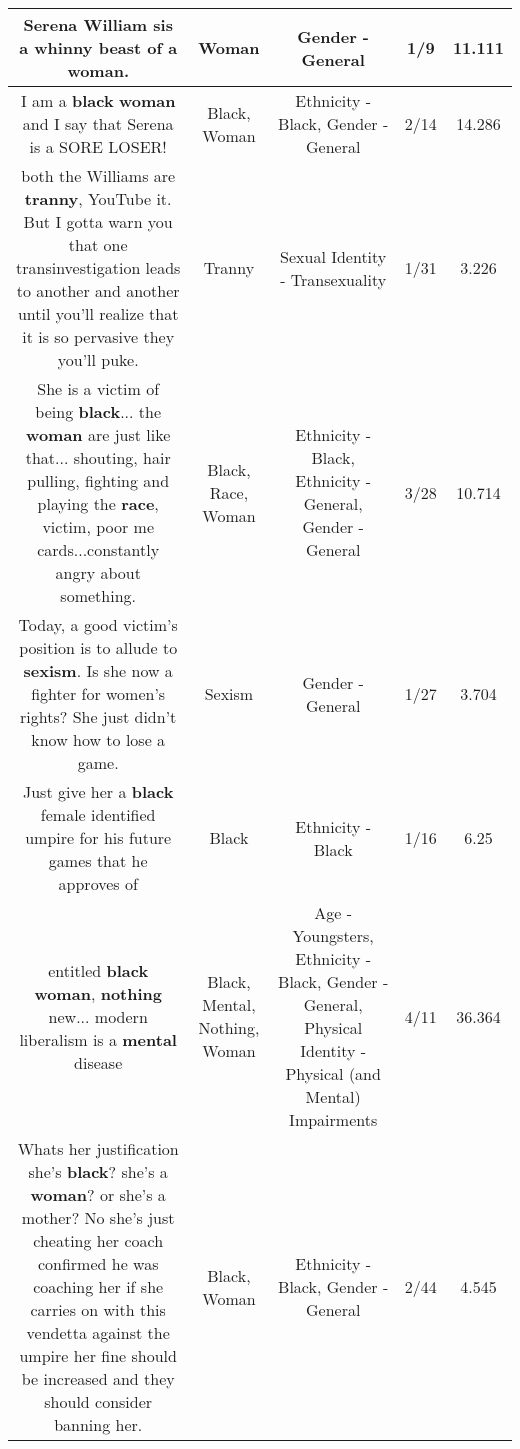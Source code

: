 \documentclass[11pt]{article}
\newlength\mylength
\begin{document}
\begin{center}
\begin{longtable}{|C{.65\mylength}|C{.30\mylength}|C{.12\mylength}|C{.12\mylength}|C{.12\mylength}|}
  \small Serena William sis a whinny beast of a \textbf{woman}.\normalsize   & Woman & Gender - General & 1/9 & 11.111 \\  \hline
  \small I am a \textbf{black} \textbf{woman} and I say that Serena is a SORE LOSER!\normalsize   & Black, Woman & Ethnicity - Black, Gender - General & 2/14 & 14.286 \\  \hline
  \small both the Williams are \textbf{tranny}, YouTube it. But I gotta warn you that one transinvestigation leads to another and another until you'll realize that it is so pervasive they you'll puke.\normalsize   & Tranny & Sexual Identity - Transexuality & 1/31 & 3.226 \\  \hline
  \small She is a victim of being \textbf{black}... the \textbf{woman} are just like that... shouting, hair pulling, fighting and playing the \textbf{race}, victim, poor me cards...constantly angry about something.\normalsize   & Black, Race, Woman & Ethnicity - Black, Ethnicity - General, Gender - General & 3/28 & 10.714 \\  \hline
  \small Today, a good victim's position is to allude to \textbf{sexism}. Is she now a fighter for women's rights? She just didn't know how to lose a game.\normalsize   & Sexism & Gender - General & 1/27 & 3.704 \\  \hline
  \small Just give her a \textbf{black} female identified umpire for his future games that he approves of\normalsize   & Black & Ethnicity - Black & 1/16 & 6.25 \\  \hline
  \small entitled \textbf{black} \textbf{woman}, \textbf{nothing} new... modern liberalism is a \textbf{mental} disease\normalsize   & Black, Mental, Nothing, Woman & Age - Youngsters, Ethnicity - Black, Gender - General, Physical Identity - Physical (and Mental) Impairments & 4/11 & 36.364 \\  \hline
  \small Whats her justification she's \textbf{black}? she's a \textbf{woman}? or she's a mother? No she's just cheating her coach confirmed he was coaching her if she carries on with this vendetta against the umpire her fine should be increased and they should consider banning her.\normalsize   & Black, Woman & Ethnicity - Black, Gender - General & 2/44 & 4.545 \\  \hline

\end{longtable}
\end{center}
\end{document}
